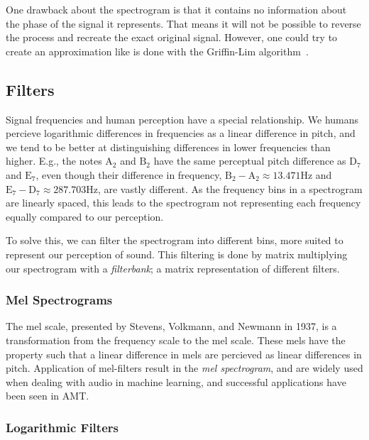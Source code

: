 One drawback about the spectrogram is that it contains no information about the phase of the signal it represents. That means it will not be possible to reverse the process and recreate the exact original signal. However, one could try to create an approximation like is done with the Griffin-Lim algorithm~\cite{1164317}.

\subsection{Filters}

Signal frequencies and human perception have a special relationship. We humans percieve logarithmic differences in frequencies as a linear difference in pitch, and we tend to be better at distinguishing differences in lower frequencies than higher. E.g., the notes $\text{A}_2$ and $\text{B}_2$ have the same perceptual pitch difference as $\text{D}_7$ and $\text{E}_7$, even though their difference in frequency, $\text{B}_2 - \text{A}_2 \approx 13.471 \text{Hz}$ and $\text{E}_7 - \text{D}_7 \approx 287.703 \text{Hz}$, are vastly different. As the frequency bins in a spectrogram are linearly spaced, this leads to the spectrogram not representing each frequency equally compared to our perception.

To solve this, we can filter the spectrogram into different bins, more suited to represent our perception of sound. This filtering is done by matrix multiplying our spectrogram with a \textit{filterbank}; a matrix representation of different filters.

\subsubsection{Mel Spectrograms}

The mel scale, presented by Stevens, Volkmann, and Newmann in 1937, is a transformation from the frequency scale to the mel scale. These mels have the property such that a linear difference in mels are percieved as linear differences in pitch. Application of mel-filters result in the \textit{mel spectrogram}, and are widely used when dealing with audio in machine learning, and successful applications have been seen in \gls{AMT}.~\cite{wolfmonheim2024spectralrhythmfeaturesaudio, gardner2022mt3multitaskmultitrackmusic, chang2024yourmt3multiinstrumentmusictranscription, 8350302, gong2021astaudiospectrogramtransformer, zehren2024analyzingreducingsynthetictorealtransfer}

\subsubsection{Logarithmic Filters}

